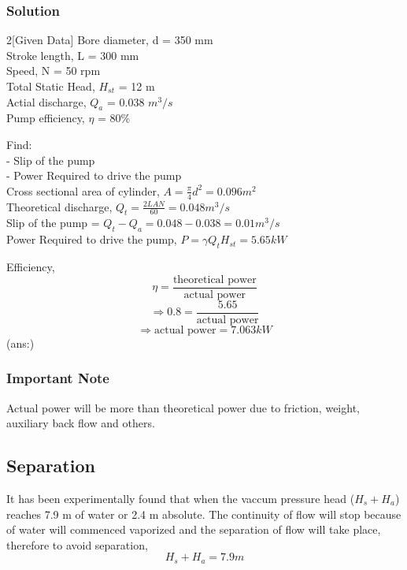 \documentclass{article}
\begin{document}
\subsubsection*{Solution}

\begin{multicols}{2}[Given Data]
  Bore diameter, d = 350 mm \\
  Stroke length, L = 300 mm \\
  Speed, N = 50 rpm \\ 
  Total Static Head, $H_{st}$ = 12 m \\
  Actial discharge, $Q_a$ = 0.038 $m^3/s$ \\
  Pump efficiency, $\eta$ = 80\% 
  
\end{multicols}

Find:\\
 - Slip of the pump \\
 - Power Required to drive the pump \\

Cross sectional area of cylinder, $A = \frac{\pi}{4} d^2 = 0.096 m^2$ \\
Theoretical discharge, $Q_t = \frac{2LAN}{60} = 0.048 m^3/s$ \\
Slip of the pump = $Q_t - Q_a = 0.048 - 0.038 = 0.01 m^3/s$ \\ 

Power Required to drive the pump, $P = \gamma Q_t H_{st} = 5.65 kW$

Efficiency, $$\eta = \frac{\text{theoretical power}}{\text{actual power}}$$
$$\Rightarrow 0.8 = \frac{5.65}{\text{actual power}}$$
$$\Rightarrow \text{actual power} = 7.063 kW $$ 
\hspace*{0.65\linewidth}(ans:)

\subsubsection*{Important Note}
Actual power will be more than theoretical power due to friction, weight, auxiliary back flow and others.


\subsection*{Separation}
It has been experimentally found that when the vaccum pressure head ($H_s + H_a$) reaches 7.9 m of water or 2.4 m absolute. The continuity of flow will stop because of water will commenced vaporized and the separation of flow will take place, therefore to avoid separation, 
$$H_s + H_a = 7.9 m$$ 
\end{document}
